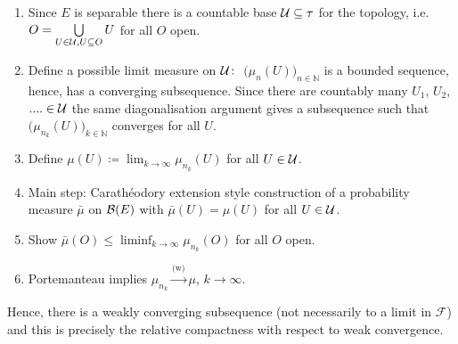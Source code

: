 \begin{enumerate}[label=(\roman*)]
	\item
		Since $E$ is separable there is a countable base $\mathcal{U} \subseteq \tau$ for the topology, i.e. $O = \bigcup\limits_{U\in\mathcal{U}, U \subseteq O} U$ for all $O$ open.
	\item
		Define a possible limit measure on $\mathcal{U}\colon$ $\big( \mu_n(U)\big)_{n\in\mathbb{N}}$ is a bounded sequence, hence, has a converging subsequence. Since there are countably many $U_1$, $U_2$,$....\in\mathcal{U}$ the same diagonalisation argument gives a subsequence such that $\big( \mu_{n_k}(U) \big)_{k\in\mathbb{N}}$ converges for all $U$.
	\item
		Define $\mu(U) \coloneqq \lim_{k\to\infty} \mu_{n_k}(U)$ for all $U \in \mathcal{U}$.
	\item
		Main step: Carath\'{e}odory extension style construction of a probability measure $\bar{\mu}$ on $\mathcal{B}(E)$ with $\bar{\mu}(U) = \mu(U)$ for all $U\in \mathcal{U}$.
	\item
		Show $\bar{\mu}(O) \leq \liminf_{k\to\infty} \mu_{n_k}(O)$ for all $O$ open.
	\item Portemanteau implies $\mu_{n_k} \overset{\text{(w)}}{\longrightarrow} \mu$, $k\to\infty$.
\end{enumerate}
Hence, there is a weakly converging subsequence (not necessarily to a limit in $\mathcal F$) and this is precisely the relative compactness with respect to weak convergence.\smallskip

